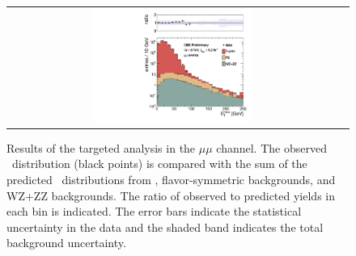 \begin{figure}[!h]
\begin{center}
\begin{tabular}{cc}
\includegraphics[width=0.5\textwidth]{plots/pfmet_bvetoMedium_mm_92fb.pdf}
\end{tabular}
\caption{Results of the targeted analysis in the $\mu\mu$ channel. The observed \MET\ distribution (black points) is compared with the sum of the predicted \MET\
distributions from \zjets, flavor-symmetric backgrounds, and WZ+ZZ backgrounds. The ratio of observed to predicted yields in each bin is
indicated. The error bars indicate the statistical uncertainty in the data and the shaded band indicates the total background uncertainty.
\label{fig:results_targ_mm}
}
\end{center}
\end{figure}



